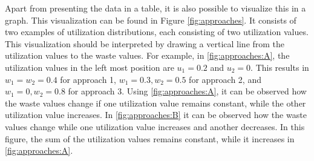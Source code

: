 \noindent
Apart from presenting the data in a table, it is also possible to visualize this in a graph. This visualization can be found in Figure \ref{fig:approaches}. It consists of two examples of utilization distributions, each consisting of two utilization values. This visualization should be interpreted by drawing a vertical line from the utilization values to the waste values. For example, in \autoref{fig:approaches:A}, the utilization values in the left most position are $u_1 = 0.2$ and $u_2 = 0$. This results in $w_1 = w_2 = 0.4$ for approach 1, $w_1 = 0.3, w_2 = 0.5$ for approach 2, and $w_1 = 0, w_2 = 0.8$ for approach 3. Using \autoref{fig:approaches:A}, it can be observed how the waste values change if one utilization value remains constant, while the other utilization value increases. In \autoref{fig:approaches:B} it can be observed how the waste values change while one utilization value increases and another decreases. In this figure, the sum of the utilization values remains constant, while it increases in \autoref{fig:approaches:A}.

